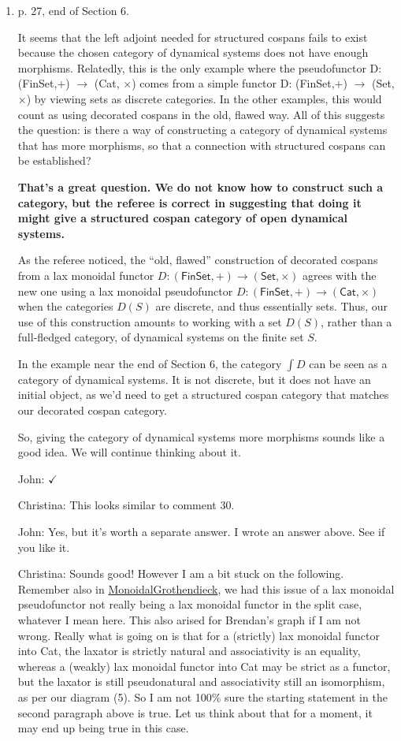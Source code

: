 \documentclass[reqno]{amsart}
\def\chris{\color{purple} Christina: }
\def\john{\color{red} John: }
\begin{document}
\begin{enumerate}
{\chris I see. Fixed, and see above.}
\fi

\item p. 27, end of Section 6.

It seems that the left adjoint needed for structured cospans fails to exist because the chosen category of dynamical systems does not have enough 
morphisms. Relatedly, this is the only example where the pseudofunctor D: (FinSet,+) $\to$ (Cat, $\times$) comes from a simple functor D: (FinSet,+) 
$\to$ (Set, $\times$) by viewing sets as discrete categories. In the other examples, this would count as using decorated cospans in the old, flawed 
way. 
All of this suggests the question: is there a way of constructing a category of dynamical systems that has more morphisms, so that a connection with 
structured cospans can be established?

{\bf That's a great question.   We do not know how to construct such a category, but the referee
is correct in suggesting that doing it might give a structured cospan category of open dynamical
systems.    

As the referee noticed, the ``old, flawed'' construction of 
decorated cospans from a lax monoidal functor $D \colon (\mathsf{FinSet},+) \to 
(\mathsf{Set}, \times) $ agrees with the new one using a lax monoidal pseudofunctor  $D \colon (\mathsf{FinSet},+) \to (\mathsf{Cat}, \times) $ when 
the categories $D(S)$ are discrete,
and thus essentially sets.   Thus, our use of this construction amounts to working with a
set $D(S)$, rather than a full-fledged category, of dynamical systems on the finite set $S$.

In the example near the end of Section 6, the category $\int \! D$ can be seen as a category
of dynamical systems.   It is not discrete, but it does not have an initial object, as we'd
need to get a structured cospan
category that matches our decorated cospan category.   

So, giving the category of dynamical systems more morphisms sounds like a good idea. We will continue thinking about it.}  { \john $\checkmark$}

{\chris This looks similar to comment 30.}

{\john Yes, but it's worth a separate answer.   I wrote an answer above.  See if you like it.  }

{\chris Sounds good! However I am a bit stuck on the following. Remember also in 
\href{https://thalis.math.upatras.gr/~cvasilak/documents/MonGroth.pdf}{MonoidalGrothendieck}, we had this issue of a lax monoidal pseudofunctor not 
really being a lax monoidal functor in the split case, whatever I mean here. This also arised for Brendan's graph if I am not wrong. Really what is 
going on is that for a (strictly) lax monoidal functor into Cat, the laxator is strictly natural and associativity is an equality, whereas a (weakly) 
lax monoidal functor into Cat may be strict as a functor, but the laxator is still pseudonatural and associativity still an isomorphism, as per our 
diagram (5). So I am not 100\% sure the starting statement in the second paragraph above is true. Let us think about that for a moment, it may end up 
being true in this case.}


\end{enumerate}
\end{document}
